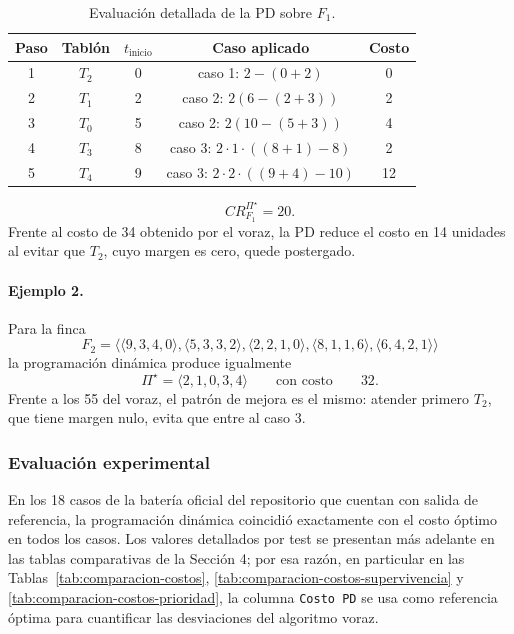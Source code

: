 \documentclass[12pt,a4paper]{article}
\begin{document}
\begin{table}[H]
  \centering
  \small
  \begin{tabular}{ccccc}
    \toprule
    Paso & Tabl\'on & \(t_{\text{inicio}}\) & Caso aplicado & Costo \\
    \midrule
    1 & \(T_2\) & 0 & caso 1: \(2-(0+2)\) & 0 \\
    2 & \(T_1\) & 2 & caso 2: \(2(6-(2+3))\) & 2 \\
    3 & \(T_0\) & 5 & caso 2: \(2(10-(5+3))\) & 4 \\
    4 & \(T_3\) & 8 & caso 3: \(2\cdot1\cdot((8+1)-8)\) & 2 \\
    5 & \(T_4\) & 9 & caso 3: \(2\cdot2\cdot((9+4)-10)\) & 12 \\
    \bottomrule
  \end{tabular}
  \caption{Evaluaci\'on detallada de la PD sobre \(F_1\).}
\end{table}

\[
CR_{F_1}^{\Pi^\star}=20.
\]
Frente al costo de 34 obtenido por el voraz, la PD reduce el costo en 14 unidades al evitar que \(T_2\), cuyo margen es cero, quede postergado.

\paragraph{Ejemplo 2.}
Para la finca
\[
F_2=\langle\langle 9,3,4,0\rangle,\langle 5,3,3,2\rangle,\langle 2,2,1,0\rangle,\langle 8,1,1,6\rangle,\langle 6,4,2,1\rangle\rangle
\]
la programaci\'on din\'amica produce igualmente
\[
\Pi^\star=\langle 2,1,0,3,4\rangle
\qquad\text{con costo}\qquad
32.
\]
Frente a los 55 del voraz, el patr\'on de mejora es el mismo: atender primero \(T_2\), que tiene margen nulo, evita que entre al caso 3.

\subsubsection{Evaluaci\'on experimental}

En los 18 casos de la bater\'ia oficial del repositorio que cuentan con salida de referencia, la programaci\'on din\'amica coincidi\'o exactamente con el costo \'optimo en todos los casos. Los valores detallados por test se presentan m\'as adelante en las tablas comparativas de la Secci\'on 4; por esa raz\'on, en particular en las Tablas~\ref{tab:comparacion-costos}, \ref{tab:comparacion-costos-supervivencia} y \ref{tab:comparacion-costos-prioridad}, la columna \texttt{Costo PD} se usa como referencia \'optima para cuantificar las desviaciones del algoritmo voraz.
\end{document}
